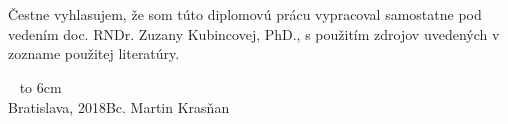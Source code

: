 \documentclass[12pt, a4paper, oneside]{book}
\newcommand\mfauthor{Bc. Martin Krasňan}
\newcommand\mfplacedate{Bratislava, 2018}
\begin{document}
\setcounter{page}{2}
\thispagestyle{empty}


\begin{figure}[H]
\begin{center}
\label{img:zadanie}
\end{center}
\end{figure}

{~}\vspace{12cm}

\noindent
\begin{minipage}{0.25\textwidth}~\end{minipage}
\begin{minipage}{0.75\textwidth}
Čestne vyhlasujem, že som túto diplomovú prácu vypracoval samostatne pod vedením doc. RNDr. Zuzany Kubincovej, PhD., s použitím zdrojov uvedených v zozname použitej literatúry.
\newline \newline
\end{minipage}
\vfill
~ \hfill {\hbox to 6cm{\dotfill}} \\
\mfplacedate \hfill \mfauthor
\vfill\eject 
\end{document}
